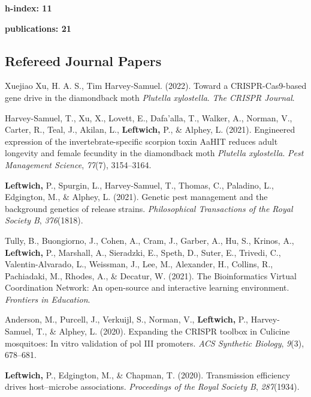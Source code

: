 \documentclass[11pt, a4paper]{awesome-cv}
\begin{document}
\textbf{h-index: 11}

\textbf{publications: 21} \endgroup

\hypertarget{refereed-journal-papers}{%
\subsection{Refereed Journal Papers}\label{refereed-journal-papers}}

\begingroup
\setlength{\parindent}{0.2in}

\hypertarget{refs_journals}{}
\leavevmode\hypertarget{ref-21}{}%
Xuejiao Xu, H. A. S., Tim Harvey-Samuel. (2022). Toward a
CRISPR-Cas9-based gene drive in the diamondback moth \emph{{Plutella}
xylostella}. \emph{The CRISPR Journal}.

\leavevmode\hypertarget{ref-19}{}%
Harvey-Samuel, T., Xu, X., Lovett, E., Dafa'alla, T., Walker, A.,
Norman, V., Carter, R., Teal, J., Akilan, L., \textbf{Leftwich,} P., \&
Alphey, L. (2021). Engineered expression of the invertebrate-specific
scorpion toxin {AaHIT} reduces adult longevity and female fecundity in
the diamondback moth \emph{{Plutella} xylostella}. \emph{Pest Management
Science}, \emph{77}(7), 3154--3164.

\leavevmode\hypertarget{ref-13}{}%
\textbf{Leftwich,} P., Spurgin, L., Harvey-Samuel, T., Thomas, C.,
Paladino, L., Edgington, M., \& Alphey, L. (2021). Genetic pest
management and the background genetics of release strains.
\emph{Philosophical Transactions of the Royal Society B},
\emph{376}(1818).

\leavevmode\hypertarget{ref-20}{}%
Tully, B., Buongiorno, J., Cohen, A., Cram, J., Garber, A., Hu, S.,
Krinos, A., \textbf{Leftwich,} P., Marshall, A., Sieradzki, E., Speth,
D., Suter, E., Trivedi, C., Valentin-Alvarado, L., Weissman, J., Lee,
M., Alexander, H., Collins, R., Pachiadaki, M., Rhodes, A., \& Decatur,
W. (2021). The {Bioinformatics} {Virtual} {Coordination} {Network}: An
open-source and interactive learning environment. \emph{Frontiers in
Education}.

\leavevmode\hypertarget{ref-11}{}%
Anderson, M., Purcell, J., Verkuijl, S., Norman, V., \textbf{Leftwich,}
P., Harvey-Samuel, T., \& Alphey, L. (2020). Expanding the CRISPR
toolbox in {Culicine} mosquitoes: In vitro validation of pol III
promoters. \emph{ACS Synthetic Biology}, \emph{9}(3), 678--681.

\leavevmode\hypertarget{ref-14}{}%
\textbf{Leftwich,} P., Edgington, M., \& Chapman, T. (2020).
Transmission efficiency drives host--microbe associations.
\emph{Proceedings of the Royal Society B}, \emph{287}(1934).
\end{document}
